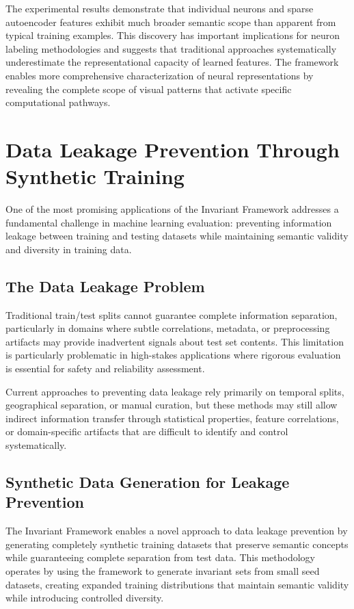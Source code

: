 The experimental results demonstrate that individual neurons and sparse autoencoder features exhibit much broader semantic scope than apparent from typical training examples. This discovery has important implications for neuron labeling methodologies and suggests that traditional approaches systematically underestimate the representational capacity of learned features. The framework enables more comprehensive characterization of neural representations by revealing the complete scope of visual patterns that activate specific computational pathways.

\section{Data Leakage Prevention Through Synthetic Training}

One of the most promising applications of the Invariant Framework addresses a fundamental challenge in machine learning evaluation: preventing information leakage between training and testing datasets while maintaining semantic validity and diversity in training data.

\subsection{The Data Leakage Problem}

Traditional train/test splits cannot guarantee complete information separation, particularly in domains where subtle correlations, metadata, or preprocessing artifacts may provide inadvertent signals about test set contents. This limitation is particularly problematic in high-stakes applications where rigorous evaluation is essential for safety and reliability assessment.

Current approaches to preventing data leakage rely primarily on temporal splits, geographical separation, or manual curation, but these methods may still allow indirect information transfer through statistical properties, feature correlations, or domain-specific artifacts that are difficult to identify and control systematically.

\subsection{Synthetic Data Generation for Leakage Prevention}

The Invariant Framework enables a novel approach to data leakage prevention by generating completely synthetic training datasets that preserve semantic concepts while guaranteeing complete separation from test data. This methodology operates by using the framework to generate invariant sets from small seed datasets, creating expanded training distributions that maintain semantic validity while introducing controlled diversity.

